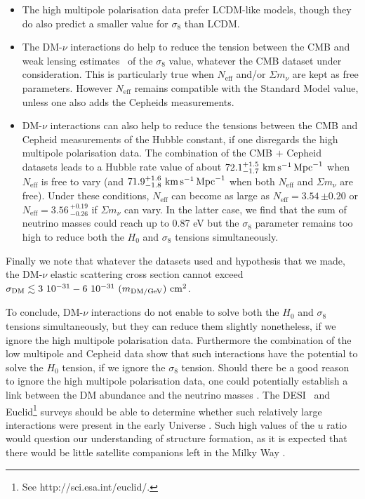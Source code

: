 \documentclass[aps,prd,a4paper,twocolumn,amsmath,showpacs,superscriptaddress,nofootinbib,preprintnumbers]{revtex4-1}
\newcommand{\neff}{N_{\mathrm{eff}}}
\newcommand{\mnu}{{\Sigma}m_{\nu}}
\begin{document}
\begin{itemize}
\item The high multipole polarisation data prefer LCDM-like models, though they do also predict a smaller value for $\sigma_8$ than LCDM. 
\item The DM-$\nu$ interactions do help to reduce the tension between the CMB and weak lensing estimates~\cite{Heymans:2012gg, Erben:2012zw, Hildebrandt:2016iqg} of the $\sigma_8$ value, whatever the CMB dataset under consideration. This is particularly true when $\neff$ and/or $\mnu$ are kept as free parameters. However $\neff$ remains compatible with the Standard Model value, unless one also adds the Cepheids measurements. 
\item DM-$\nu$ interactions can also help to reduce the tensions between the CMB and Cepheid measurements of the Hubble constant, if one disregards the high multipole polarisation data. The combination of the CMB $+$ Cepheid datasets leads to a Hubble rate value of about $72.1^{+1.5}_{-1.7} \ \rm{km} \, \rm{s}^{-1} \, \rm{Mpc}^{-1}$ when  $\neff$ is free to vary (and $71.9^{+1.6}_{-1.8} \  \rm{km} \, \rm{s}^{-1} \, \rm{Mpc}^{-1}$ when both $\neff$ and $\mnu$ are free). 
Under these conditions, $\neff$ can become as large as $\neff=3.54 \, {\pm 0.20}$ or $\neff=3.56\,_{-0.26}^{+0.19}$ if $\mnu$ can vary. In the latter case, we find that the sum of neutrino masses could reach up to 0.87 eV but the $\sigma_8$ parameter  remains too high to reduce both the $H_0$ and $\sigma_8$ tensions simultaneously.  
\end{itemize}

Finally we note that whatever the datasets used and hypothesis that we made, the DM-$\nu$ elastic scattering cross section cannot exceed $\sigma_{\rm{DM}} \lesssim 3 \ 10^{-31} - 6 \ 10^{-31} \ (m_{\rm{DM}/\rm{GeV}}) \ \rm{cm^2}$. 

To conclude, DM-$\nu$ interactions do not enable to solve both the $H_0$ and $\sigma_8$ tensions simultaneously, but they can reduce them slightly nonetheless, if we ignore the high multipole polarisation data. Furthermore the combination of the low multipole and Cepheid data \cite{R16} show that such interactions have the potential to solve the $H_0$ tension, if we ignore the $\sigma_8$ tension. Should there be a good reason to ignore the high multipole polarisation data, one could potentially establish a link between the DM abundance and the neutrino masses \cite{Boehm:2006mi,Ma:2006km,Farzan:2009ji,Farzan:2010mr,Arhrib:2015dez}. 
The DESI~\cite{Levi:2013gra} and Euclid\footnote{See http://sci.esa.int/euclid/.} surveys should be able to determine whether such relatively large interactions were present in the early Universe \cite{Escudero:2015yka}. Such high values of the $u$ ratio would question our understanding of structure formation, as it is expected that there would be little satellite companions left in the Milky Way \cite{Boehm:2014vja}. 
\end{document}
